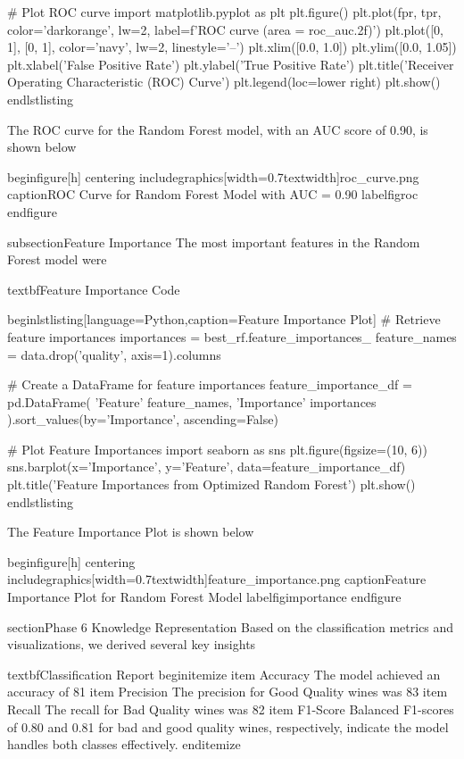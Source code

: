 # Plot ROC curve
import matplotlib.pyplot as plt
plt.figure()
plt.plot(fpr, tpr, color='darkorange', lw=2, label=f'ROC curve (area = {roc_auc.2f})')
plt.plot([0, 1], [0, 1], color='navy', lw=2, linestyle='--')
plt.xlim([0.0, 1.0])
plt.ylim([0.0, 1.05])
plt.xlabel('False Positive Rate')
plt.ylabel('True Positive Rate')
plt.title('Receiver Operating Characteristic (ROC) Curve')
plt.legend(loc=lower right)
plt.show()
end{lstlisting}

The ROC curve for the Random Forest model, with an AUC score of 0.90, is shown below

begin{figure}[h]
    centering
    includegraphics[width=0.7textwidth]{roc_curve.png}  %
    caption{ROC Curve for Random Forest Model with AUC = 0.90}
    label{figroc}
end{figure}

subsection{Feature Importance}
The most important features in the Random Forest model were

textbf{Feature Importance Code}

begin{lstlisting}[language=Python,caption=Feature Importance Plot]
# Retrieve feature importances
importances = best_rf.feature_importances_
feature_names = data.drop('quality', axis=1).columns

# Create a DataFrame for feature importances
feature_importance_df = pd.DataFrame({
    'Feature' feature_names,
    'Importance' importances
}).sort_values(by='Importance', ascending=False)

# Plot Feature Importances
import seaborn as sns
plt.figure(figsize=(10, 6))
sns.barplot(x='Importance', y='Feature', data=feature_importance_df)
plt.title('Feature Importances from Optimized Random Forest')
plt.show()
end{lstlisting}

The Feature Importance Plot is shown below

begin{figure}[h]
    centering
    includegraphics[width=0.7textwidth]{feature_importance.png}  %
    caption{Feature Importance Plot for Random Forest Model}
    label{figimportance}
end{figure}

section{Phase 6 Knowledge Representation}
Based on the classification metrics and visualizations, we derived several key insights

textbf{Classification Report}
begin{itemize}
    item Accuracy The model achieved an accuracy of 81%
    item Precision The precision for Good Quality wines was 83%
    item Recall The recall for Bad Quality wines was 82%
    item F1-Score Balanced F1-scores of 0.80 and 0.81 for bad and good quality wines, respectively, indicate the model handles both classes effectively.
end{itemize}

